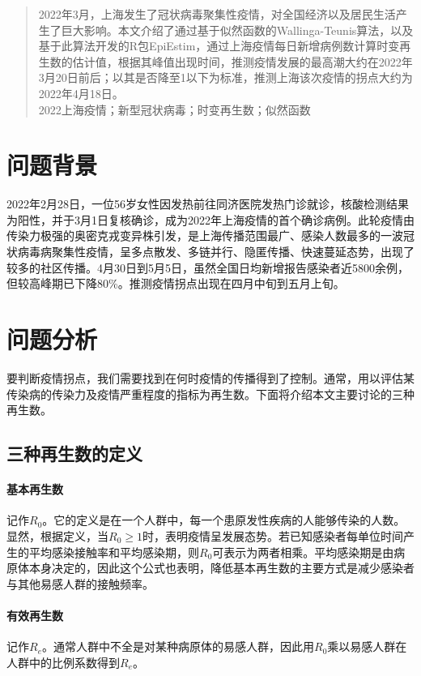 \documentclass[a4paper,12pt,onecolumn,twoside]{article}
\begin{document}
\begin{center}
	\Large{}
\end{center}
\begin{abstract}
	2022年3月，上海发生了冠状病毒聚集性疫情，对全国经济以及居民生活产生了巨大影响。本文介绍了通过基于似然函数的Wallinga-Teunis算法，以及基于此算法开发的R包EpiEstim，通过上海疫情每日新增病例数计算时变再生数的估计值，根据其峰值出现时间，推测疫情发展的最高潮大约在2022年3月20日前后；以其是否降至1以下为标准，推测上海该次疫情的拐点大约为2022年4月18日。\\
	2022上海疫情；新型冠状病毒；时变再生数；似然函数
\end{abstract}
\section{问题背景}
2022年2月28日，一位56岁女性因发热前往同济医院发热门诊就诊，核酸检测结果为阳性，并于3月1日复核确诊，成为2022年上海疫情的首个确诊病例。此轮疫情由传染力极强的奥密克戎变异株引发，是上海传播范围最广、感染人数最多的一波冠状病毒病聚集性疫情，呈多点散发、多链并行、隐匿传播、快速蔓延态势，出现了较多的社区传播。4月30日到5月5日，虽然全国日均新增报告感染者近5800余例，但较高峰期已下降80\%。推测疫情拐点出现在四月中旬到五月上旬。
\section{问题分析}
要判断疫情拐点，我们需要找到在何时疫情的传播得到了控制。通常，用以评估某传染病的传染力及疫情严重程度的指标为再生数。下面将介绍本文主要讨论的三种再生数。
\subsection{三种再生数的定义}
\paragraph{基本再生数~}记作$R_{0}$。它的定义是在一个人群中，每一个患原发性疾病的人能够传染的人数。显然，根据定义，当$R_{0}\geq1$时，表明疫情呈发展态势。若已知感染者每单位时间产生的平均感染接触率和平均感染期，则$R_{0}$可表示为两者相乘。平均感染期是由病原体本身决定的，因此这个公式也表明，降低基本再生数的主要方式是减少感染者与其他易感人群的接触频率。
\paragraph{有效再生数~}记作$R_{e}$。通常人群中不全是对某种病原体的易感人群，因此用$R_{0}$乘以易感人群在人群中的比例系数得到$R_{e}$。
\end{document}
